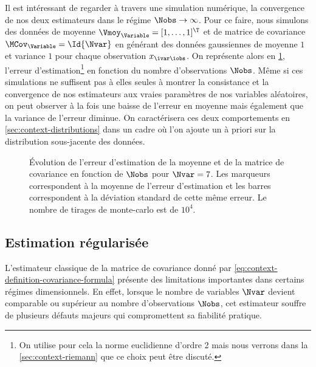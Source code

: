 Il est intéressant de regarder à travers une simulation numérique, la convergence de nos deux estimateurs dans le régime $\Nobs\to\infty$. Pour ce faire, nous simulons des données de moyenne $\Vmoy_\Variable = [1,\dots,1]^\T$ et de matrice de covariance $\MCov_\Variable=\Id{\Nvar}$ en générant des données gaussiennes de moyenne $1$ et variance $1$ pour chaque observation $x_{\ivar\iobs}$. On représente alors en \cref{fig:context-estimation-errorscm}, l'erreur d'estimation\footnote{On utilise pour cela la norme euclidienne d'ordre 2 mais nous verrons dans la \cref{sec:context-riemann} que ce choix peut être discuté.} en fonction du nombre d'observations $\Nobs$. Même si ces simulations ne suffisent pas à elles seules à montrer la consistance et la convergence de nos estimateurs aux vraies paramètres de nos variables aléatoires, on peut observer à la fois une baisse de l'erreur en moyenne mais également que la variance de l'erreur diminue. On caractérisera ces deux comportements en \cref{sec:context-distributions} dans un cadre où l'on ajoute un à priori sur la distribution sous-jacente des données.

\begin{figure}[h]
    \begin{center}
    
    
  \end{center}
  \provScmmeanQR[.5cm]
    \caption{\'Evolution de l'erreur d'estimation de la moyenne et de la matrice de covariance en fonction de $\Nobs$ pour $\Nvar=7$. Les marqueurs correspondent à la moyenne de l'erreur d'estimation et les barres correspondent à la déviation standard de cette même erreur. Le nombre de tirages de monte-carlo est de $ 10^4$. \provScmcov}
  \label{fig:context-estimation-errorscm}
\end{figure}



\subsection{Estimation régularisée}
\label{subsec:context-covariance-regularized-estimation}

  


L'estimateur classique de la matrice de covariance donné par \cref{eq:context-definition-covariance-formula} présente des limitations importantes dans certains régimes dimensionnels. En effet, lorsque le nombre de variables $\Nvar$ devient comparable ou supérieur au nombre d'observations $\Nobs$, cet estimateur souffre de plusieurs défauts majeurs qui compromettent sa fiabilité pratique.

